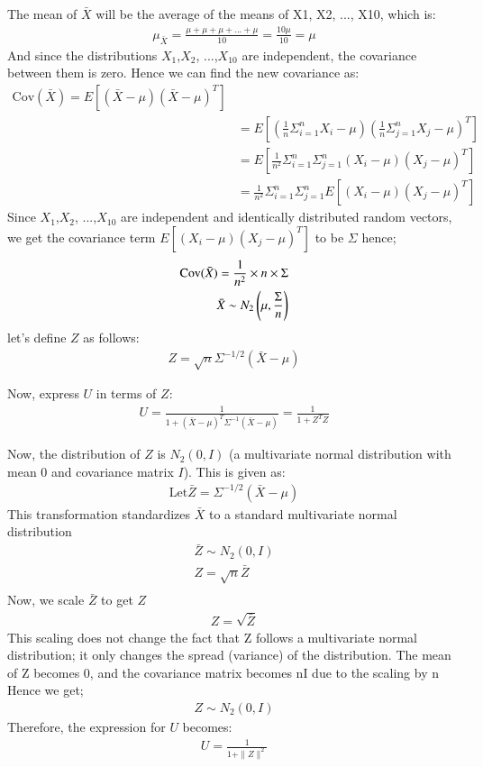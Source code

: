 \documentclass[journal,12pt,onecolumn]{IEEEtran}
\theoremstyle{remark}
\begin{document}
The mean of $\bar{X}$ will be the average of the means of X1, X2, ..., X10, which is:
\begin{align}
    \mu_{\bar{X}} =\frac{\mu + \mu + \mu + ... + \mu}{10} = \frac{10\mu}{10} = \mu   
\end{align}
And since the distributions $X_1$,$X_2$, ...,$X_{10}$ are independent, the covariance between them is zero. Hence we can find 
the new covariance as:\\
\begin{align}
    \text{Cov}(\bar{X}) = E[(\bar{X}-\mu)(\bar{X}-\mu)^T]\\
     &= E[(\frac{1}{n}\Sigma_{i = 1}^{n} X_{i} - \mu)(\frac{1}{n}\Sigma_{j = 1}^{n} X_{j} - \mu)^T] \\
     &= E[\frac{1}{n^2}\Sigma_{i = 1}^{n}\Sigma_{j = 1}^{n}(X_{i} - \mu)(X_{j} - \mu)^T]\\
     &= \frac{1}{n^2}\Sigma_{i = 1}^{n}\Sigma_{j = 1}^{n}E[(X_{i} - \mu)(X_{j} - \mu)^T]
\end{align}
Since $X_1$,$X_2$, ...,$X_{10}$ are independent and identically distributed random vectors, we get the covariance term $E[(X_{i} - \mu)(X_{j} - \mu)^T]$
to be $\Sigma$
hence;
\begin{align}
    \text{Cov}(\bar{X}) = \frac{1}{n^2}\times n\times\Sigma\\
    \bar{X} \sim N_2\left(\mu,\frac{\Sigma}{n}\right)
\end{align}
let's define $Z$ as follows:
\begin{align}
     Z = \sqrt{n}\Sigma^{-1/2}(\bar{X} - \mu)
\end{align}

Now, express $U$ in terms of $Z$:
\begin{align}
    U = \frac{1}{1 + (\bar{X} - \mu)^T \Sigma^{-1} (\bar{X} - \mu)}
    = \frac{1}{1 + Z^T Z}
\end{align}

Now, the distribution of $Z$ is $N_2(0, I)$ (a multivariate normal distribution with mean $0$ and covariance matrix $I$). This is given as:
\begin{align}
    \text{Let} \bar{Z} = \Sigma^{-1/2}(\bar{X} - \mu)
\end{align} 
This transformation standardizes $\bar{X}$ to a standard multivariate normal distribution
\begin{align}
\bar{Z} \sim N_2(0,I)\\
Z = \sqrt{n}\bar{Z}\\
\end{align}
Now, we scale $\bar{Z}$ to get $Z$
\begin{align}
    Z = \sqrt{\bar{Z}}
\end{align}
This scaling does not change the fact that Z follows a multivariate normal distribution; it only changes the spread (variance) of the distribution. The mean of Z becomes 
0, and the covariance matrix becomes nI due to the scaling by n\\
Hence we get;
\begin{align}
    Z \sim N_2(0,I)
\end{align}
Therefore, the expression for $U$ becomes:
\begin{align}
    U = \frac{1}{1 + \|Z\|^2}
\end{align}
\end{document}
